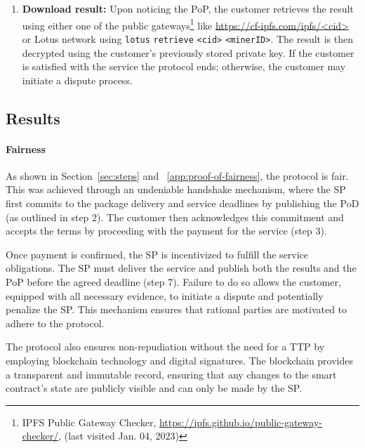 \documentclass[pdftex,twocolumn,epjc3]{svjour3}
\begin{document}
\begin{enumerate}
  \item \textbf{Download result:} Upon noticing the PoP, the customer retrieves the result using either one of the public gateways\footnote{IPFS Public Gateway Checker, \url{https://ipfs.github.io/public-gateway-checker/}, (last visited Jan. 04, 2023)} like \url{https://cf-ipfs.com/ipfs/<cid>} or Lotus network using \texttt{lotus} \texttt{retrieve} \texttt{<cid>} \texttt{<minerID>}. The result is then decrypted using the customer's previously stored private key. If the customer is satisfied with the service the protocol ends; otherwise, the customer may initiate a dispute process.
  
\end{enumerate}

\subsection{Results}

\paragraph{Fairness}
As shown in Section~\ref{sec:steps} and ~\ref{app:proof-of-fairness}, the protocol is fair. This was achieved through an undeniable handshake mechanism, where the SP first commits to the package delivery and service deadlines by publishing the PoD (as outlined in step 2). The customer then acknowledges this commitment and accepts the terms by proceeding with the payment for the service (step 3).

Once payment is confirmed, the SP is incentivized to fulfill the service obligations. The SP must deliver the service and publish both the results and the PoP before the agreed deadline (step 7). Failure to do so allows the customer, equipped with all necessary evidence, to initiate a dispute and potentially penalize the SP. This mechanism ensures that rational parties are motivated to adhere to the protocol.

The protocol also ensures non-repudiation without the need for a TTP by employing blockchain technology and digital signatures. The blockchain provides a transparent and immutable record, ensuring that any changes to the smart contract's state are publicly visible and can only be made by the SP.
\end{document}
